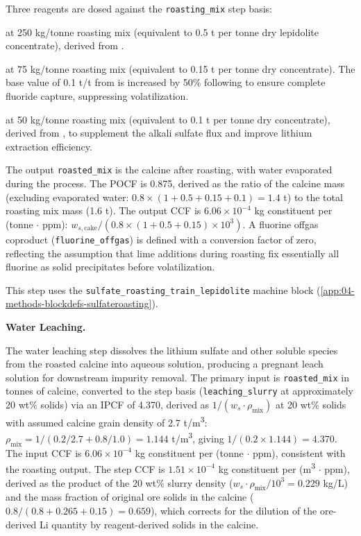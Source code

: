 Three reagents are dosed against the \texttt{roasting\_mix} step basis:
\begin{description}[noitemsep, topsep=0pt]
\item[\textbullet\enskip Sodium sulfate (\ce{Na2SO4})] at 250 kg/tonne roasting mix (equivalent to 0.5 t per tonne dry lepidolite concentrate), derived from \citet{yanExtractionLithiumLepidolite2012}.
\item[\textbullet\enskip Lime (\ce{CaO})] at 75 kg/tonne roasting mix (equivalent to 0.15 t per tonne dry concentrate). The base value of 0.1 t/t from \citet{yanExtractionLithiumLepidolite2012} is increased by 50\% following \citet{luongFactorsAffectingExtraction2013} to ensure complete fluoride capture, suppressing  volatilization.
\item[\textbullet\enskip Potassium sulfate (\ce{K2SO4})] at 50 kg/tonne roasting mix (equivalent to 0.1 t per tonne dry concentrate), derived from \citet{yanExtractionLithiumLepidolite2012}, to supplement the alkali sulfate flux and improve lithium extraction efficiency.
\end{description}
The output \texttt{roasted\_mix} is the calcine after roasting, with water evaporated during the process. The POCF is 0.875, derived as the ratio of the calcine mass (excluding evaporated water: $0.8 \times (1 + 0.5 + 0.15 + 0.1) = 1.4$ t) to the total roasting mix mass (1.6 t). The output CCF is $6.06 \times 10^{-4}$ kg constituent per (tonne $\cdot$ ppm): $w_{s,\text{cake}} / (0.8 \times (1 + 0.5 + 0.15) \times 10^3)$. A fluorine offgas coproduct (\texttt{fluorine\_offgas}) is defined with a conversion factor of zero, reflecting the assumption that lime additions during roasting fix essentially all fluorine as solid precipitates before volatilization.

This step uses the \texttt{sulfate\_roasting\_train\_lepidolite} machine block (\ref{app:04-methods-blockdefs-sulfateroasting}).

\medskip
\noindent\textbf{Water Leaching.}\quad

The water leaching step dissolves the lithium sulfate and other soluble species from the roasted calcine into aqueous solution, producing a pregnant leach solution for downstream impurity removal. The primary input is \texttt{roasted\_mix} in tonnes of calcine, converted to the step basis (\texttt{leaching\_slurry} at approximately 20 wt\% solids) via an IPCF of 4.370, derived as $1/(w_s \cdot \rho_{\text{mix}})$ at 20 wt\% solids with assumed calcine grain density of 2.7 t/m\textsuperscript{3}: $\rho_{\text{mix}} = 1/(0.2/2.7 + 0.8/1.0) = 1.144$ t/m\textsuperscript{3}, giving $1/(0.2 \times 1.144) = 4.370$. The input CCF is $6.06 \times 10^{-4}$ kg constituent per (tonne $\cdot$ ppm), consistent with the roasting output. The step CCF is $1.51 \times 10^{-4}$ kg constituent per (m\textsuperscript{3} $\cdot$ ppm), derived as the product of the 20 wt\% slurry density ($w_s \cdot \rho_{\text{mix}} / 10^3 = 0.229$ kg/L) and the mass fraction of original ore solids in the calcine ($0.8 / (0.8 + 0.265 + 0.15) = 0.659$), which corrects for the dilution of the ore-derived Li quantity by reagent-derived solids in the calcine.

